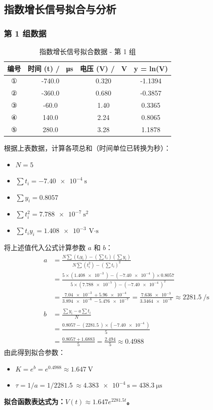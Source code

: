 \documentclass[12pt, a4paper]{ctexrep}
\begin{document}
\subsection{指数增长信号拟合与分析}
\subsubsection{第 1 组数据}
\begin{table}[htbp]
    \centering
    \caption{指数增长信号拟合数据 - 第 1 组}
    \label{tab:growth1}
    \begin{tabular}{cccc}
        \toprule
        \textbf{编号} & \textbf{时间 (t) / \SI{}{\micro\second}} & \textbf{电压 (V) / \SI{}{\volt}} & \textbf{y = ln(V)} \\
        \midrule
        ① & -740.0 & 0.320 & -1.1394 \\
        ② & -360.0 & 0.680 & -0.3857 \\
        ③ & -60.0  & 1.40  & 0.3365  \\
        ④ & 140.0  & 2.24  & 0.8065  \\
        ⑤ & 280.0  & 3.28  & 1.1878  \\
        \bottomrule
    \end{tabular}
\end{table}
根据上表数据，计算各项总和（时间单位已转换为秒）：
\begin{itemize}
    \item $N = 5$
    \item $\sum t_i = \SI{-7.40e-4}{\second}$
    \item $\sum y_i = 0.8057$
    \item $\sum t_i^2 = \SI{7.788e-7}{\second\squared}$
    \item $\sum t_i y_i = \SI{1.408e-3}{\volt\cdot\second}$
\end{itemize}
将上述值代入公式计算参数 $a$ 和 $b$：
\begin{align*}
    a &= \frac{N \sum(t_i y_i) - (\sum t_i)(\sum y_i)}{N \sum(t_i^2) - (\sum t_i)^2} \\
      &= \frac{5 \times (\SI{1.408e-3}{}) - (\SI{-7.40e-4}{}) \times 0.8057}{5 \times (\SI{7.788e-7}{}) - (\SI{-7.40e-4}{})^2} \\
      &= \frac{\SI{7.04e-3}{} + \SI{5.96e-4}{}}{\SI{3.894e-6}{} - \SI{5.476e-7}{}} = \frac{\SI{7.636e-3}{}}{\SI{3.3464e-6}{}} \approx \SI{2281.5}{\per\second} \\
    \\
    b &= \frac{\sum y_i - a \sum t_i}{N} \\
      &= \frac{0.8057 - (\SI{2281.5}{}) \times (\SI{-7.40e-4}{})}{5} \\
      &= \frac{0.8057 + 1.6883}{5} = \frac{2.494}{5} \approx 0.4988
\end{align*}
由此得到拟合参数：
\begin{itemize}
    \item $K = e^b = e^{0.4988} \approx \SI{1.647}{\volt}$
    \item $\tau = 1/a = 1 / \SI{2281.5}{} \approx \SI{4.383e-4}{\second} = \SI{438.3}{\micro\second}$
\end{itemize}
\textbf{拟合函数表达式为：$V(t) \approx 1.647 e^{2281.5 t}$。}
\end{document}
